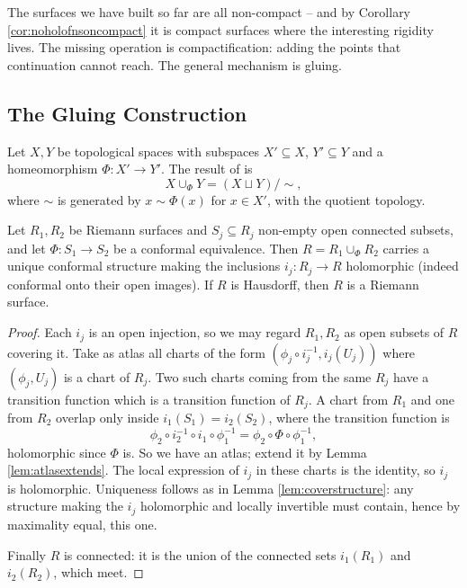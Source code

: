 The surfaces we have built so far are all non-compact -- and by Corollary
\ref{cor:noholofnsoncompact} it is compact surfaces where the interesting rigidity lives.
The missing operation is compactification: adding the points that continuation cannot
reach. The general mechanism is gluing.

\subsection{The Gluing Construction}

\begin{definition}[Gluing]
	Let $X, Y$ be topological spaces with subspaces $X' \subseteq X$, $Y' \subseteq Y$ and a
	homeomorphism $\Phi : X' \to Y'$. The result of 
	is
	$$
	X \cup_\Phi Y = (X \sqcup Y)/\!\sim,
	$$
	where $\sim$ is generated by $x \sim \Phi(x)$ for $x \in X'$, with the quotient topology.
\end{definition}

\begin{proposition}\label{prop:gluingsurfaces}
	Let $R_1, R_2$ be Riemann surfaces and $S_j \subseteq R_j$ non-empty open connected
	subsets, and let $\Phi : S_1 \to S_2$ be a conformal equivalence. Then $R = R_1\cup_\Phi R_2$
	carries a unique conformal structure making the inclusions $i_j : R_j \to R$ holomorphic
	(indeed conformal onto their open images). If $R$ is Hausdorff, then $R$ is a Riemann
	surface.
\end{proposition}

\begin{proof}
	Each $i_j$ is an open injection, so we may regard $R_1, R_2$ as open subsets of $R$
	covering it. Take as atlas all charts of the form $(\phi_j\circ i_j^{-1}, i_j(U_j))$
	where $(\phi_j, U_j)$ is a chart of $R_j$. Two such charts coming from the same $R_j$
	have a transition function which is a transition function of $R_j$. A chart from $R_1$
	and one from $R_2$ overlap only inside $i_1(S_1) = i_2(S_2)$, where the transition
	function is
	$$
	\phi_2 \circ i_2^{-1}\circ i_1 \circ \phi_1^{-1} = \phi_2\circ \Phi \circ \phi_1^{-1},
	$$
	holomorphic since $\Phi$ is. So we have an atlas; extend it by Lemma
	\ref{lem:atlasextends}. The local expression of $i_j$ in these charts is the identity, so
	$i_j$ is holomorphic. Uniqueness follows as in Lemma \ref{lem:coverstructure}: any
	structure making the $i_j$ holomorphic and locally invertible must contain, hence by
	maximality equal, this one.

	Finally $R$ is connected: it is the union of the connected sets $i_1(R_1)$ and
	$i_2(R_2)$, which meet.
\end{proof}

